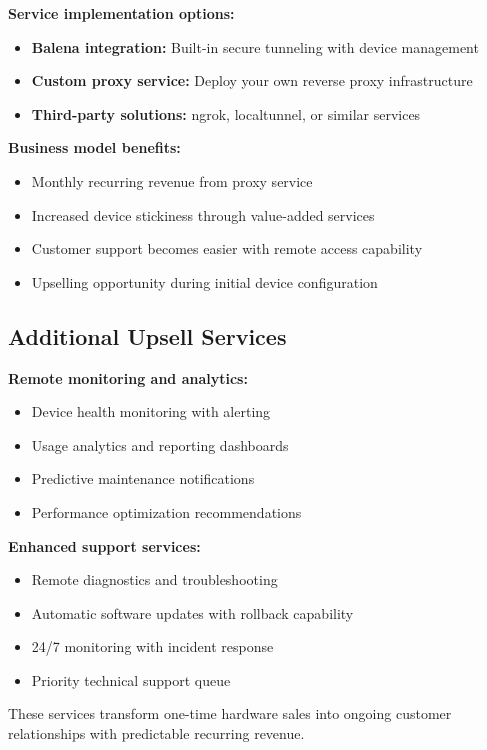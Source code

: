 \textbf{Service implementation options:}
\begin{itemize}
\item \textbf{Balena integration:} Built-in secure tunneling with device management
\item \textbf{Custom proxy service:} Deploy your own reverse proxy infrastructure
\item \textbf{Third-party solutions:} ngrok, localtunnel, or similar services
\end{itemize}

\textbf{Business model benefits:}
\begin{itemize}
\item Monthly recurring revenue from proxy service
\item Increased device stickiness through value-added services
\item Customer support becomes easier with remote access capability
\item Upselling opportunity during initial device configuration
\end{itemize}

\subsection{Additional Upsell Services}

\textbf{Remote monitoring and analytics:}
\begin{itemize}
\item Device health monitoring with alerting
\item Usage analytics and reporting dashboards  
\item Predictive maintenance notifications
\item Performance optimization recommendations
\end{itemize}

\textbf{Enhanced support services:}
\begin{itemize}
\item Remote diagnostics and troubleshooting
\item Automatic software updates with rollback capability
\item 24/7 monitoring with incident response
\item Priority technical support queue
\end{itemize}

These services transform one-time hardware sales into ongoing customer relationships with predictable recurring revenue.


